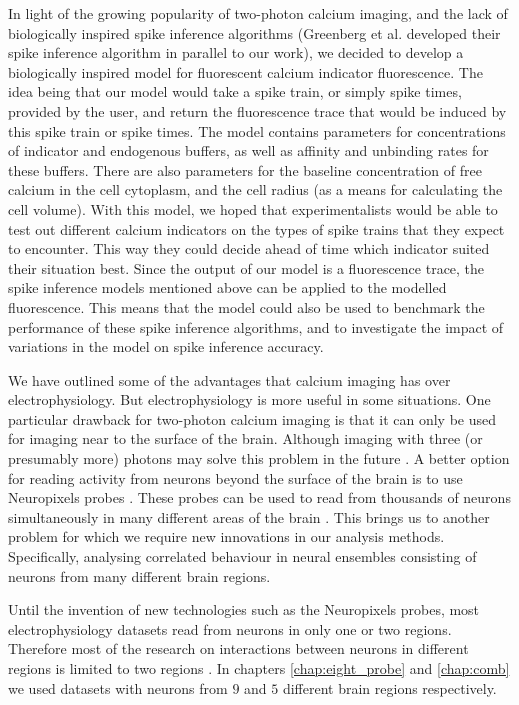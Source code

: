 In light of the growing popularity of two-photon calcium imaging, and the lack of biologically inspired spike inference algorithms (Greenberg et al. developed their spike inference algorithm in parallel to our work), we decided to develop a biologically inspired model for fluorescent calcium indicator fluorescence. The idea being that our model would take a spike train, or simply spike times, provided by the user, and return the fluorescence trace that would be induced by this spike train or spike times. The model contains parameters for concentrations of indicator and endogenous buffers, as well as affinity and unbinding rates for these buffers. There are also parameters for the baseline concentration of free calcium in the cell cytoplasm, and the cell radius (as a means for calculating the cell volume). With this model, we hoped that experimentalists would be able to test out different calcium indicators on the types of spike trains that they expect to encounter. This way they could decide ahead of time which indicator suited their situation best. Since the output of our model is a fluorescence trace, the spike inference models mentioned above can be applied to the modelled fluorescence. This means that the model could also be used to benchmark the performance of these spike inference algorithms, and to investigate the impact of variations in the model on spike inference accuracy.

We have outlined some of the advantages that calcium imaging has over electrophysiology. But electrophysiology is more useful in some situations. One particular drawback for two-photon calcium imaging is that it can only be used for imaging near to the surface of the brain. Although imaging with three (or presumably more) photons may solve this problem in the future \parencite{ouzounov}. A better option for reading activity from neurons beyond the surface of the brain is to use Neuropixels probes \parencite{jun}. These probes can be used to read from thousands of neurons simultaneously in many different areas of the brain \parencite{allen, stringer, steinmetz, steinmetz2019}. This brings us to another problem for which we require new innovations in our analysis methods. Specifically, analysing correlated behaviour in neural ensembles consisting of neurons from many different brain regions.

Until the invention of new technologies such as the Neuropixels probes, most electrophysiology datasets read from neurons in only one or two regions. Therefore most of the research on interactions between neurons in different regions is limited to two regions \parencite{wierzynski, patterson, girard}. In chapters \ref{chap:eight_probe} and \ref{chap:comb} we used datasets with neurons from $9$ and $5$ different brain regions respectively.

